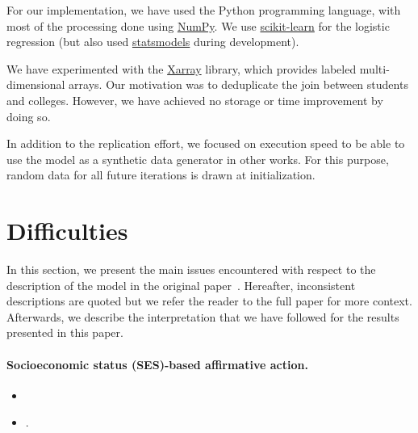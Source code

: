 For our implementation, we have used the Python programming language, with most of the processing done using \href{https://numpy.org/}{NumPy}.
We use \href{https://scikit-learn.org/}{scikit-learn} for the logistic regression (but also used
\href{https://www.statsmodels.org/}{statsmodels} during development).

We have experimented with the \href{https://xarray.dev/}{Xarray} library, which provides labeled multi-dimensional arrays.
Our motivation was to deduplicate the join between students and colleges.
However, we have achieved no storage or time improvement by doing so.

In addition to the replication effort, we focused on execution speed to be able to use the model as a synthetic data generator in other works. For this purpose, random data for all future iterations is drawn at initialization.

\section{Difficulties}\label{sec:diff}

In this section, we present the main issues encountered with respect to the description of the model in the original paper~\cite{reardon2018levels}.
Hereafter, inconsistent descriptions are quoted but we refer the reader to the full paper for more context.
Afterwards, we describe the interpretation that we have followed for the results presented in this paper.

\paragraph{Socioeconomic status (SES)-based affirmative action.}

\begin{itemize}

\item{}

\item{}.

\end{itemize}


